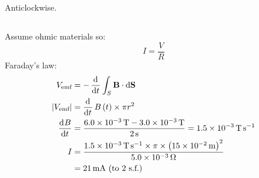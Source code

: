 \subsection{}
Anticlockwise.

\subsection{}
Assume ohmic materials so:
\begin{equation*}
    I = \frac{V}{R}
\end{equation*}
Faraday's law:
\begin{align*}
    V_{\textrm{emf}} & = - \dod{}{t} \int_S \mathbf{B} \cdot \dif \mathbf{S}\\
    \abs{V_{\textrm{emf}}} & = \dod{}{t} B\del{t} \times \pi r^2\\
    \dod{B}{t} & = \frac{\SI{6.0e-3}{\tesla} - \SI{3.0e-3}{\tesla}}{\SI{2}{\second}} = \SI{1.5e-3}{\tesla\second\tothe{-1}}\\
    I & = \frac{\SI{1.5e-3}{\tesla\second\tothe{-1}} \times \pi \times \del{\SI{15e-2}{\metre}}^2}{\SI{5.0e-3}{\ohm}}\\
    & = \SI{21}{\milli\ampere} \textrm{ (to 2 s.f.)}
\end{align*}
